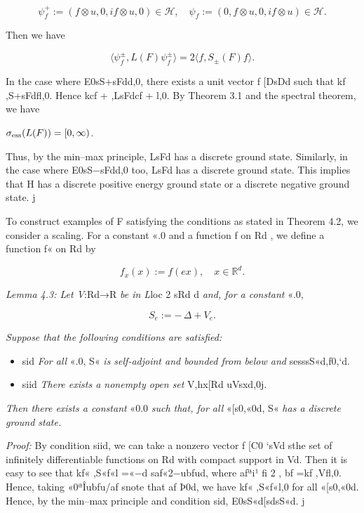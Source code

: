 \documentclass{article}
\begin{document}
$$\psi_{f}^{+}{:=}(f\otimes u,0,i f\otimes u,0)\in{\mathcal{H}},\quad\psi_{f}{:=}(0,f\otimes u,0,i f\otimes u)\in{\mathcal{H}}.$$

Then we have

$$\langle\psi_{f}^{\pm},L(F)\psi_{f}^{\pm}\rangle=2\langle f,S_{\pm}(F)f\rangle.$$

In the case where E0sS+sFdd,0, there exists a unit vector f [DsDd such that kf ,S+sFdfl,0. Hence kcf + ,LsFdcf + l,0. By Theorem 3.1 and the spectral theorem, we have

$\sigma_{\rm ess}(L(F))=[0,\infty)$.

Thus, by the min–max principle, LsFd has a discrete ground state. Similarly, in the case where E0sS−sFdd,0 too, LsFd has a discrete ground state. This implies that H has a discrete positive energy ground state or a discrete negative ground state. j

To construct examples of F satisfying the conditions as stated in Theorem 4.2, we consider a scaling. For a constant «.0 and a function f on Rd , we define a function f« on Rd by

$$f_{x}(x){:=}f(e x),\quad x\in\mathbb{R}^{d}.$$

\textit{Lemma 4.3: Let V}:Rd→R \textit{be in L}loc 2 sRd d \textit{and, for a constant} «.0,

$$S_{e}\!:=-\,\Delta+V_{e}.$$

\textit{Suppose that the following conditions are satisfied:}
\begin{itemize}
\item 
sid \textit{For all} «.0, S« \textit{is self-adjoint and bounded from below and} sesssS«d,f0,`d.

\item 
siid \textit{There exists a nonempty open set} V,hx[Rd uVsxd,0j.

\end{itemize}

\textit{Then there exists a constant} «0.0 \textit{such that, for all} «[s0,«0d, S« \textit{has a discrete ground state.}

\textit{Proof:} By condition siid, we can take a nonzero vector f [C0 `sVd sthe set of infinitely differentiable functions on Rd with compact support in Vd. Then it is easy to see that kf« ,S«f«l =«−d saf«2−ubfud, where afªi¹ fi 2 , bf =kf ,Vfl,0. Hence, taking «0ªÎubfu/af snote that af Þ0d, we have kf« ,S«f«l,0 for all «[s0,«0d. Hence, by the min–max principle and condition sid, E0sS«d[sdsS«d. j
\end{document}
